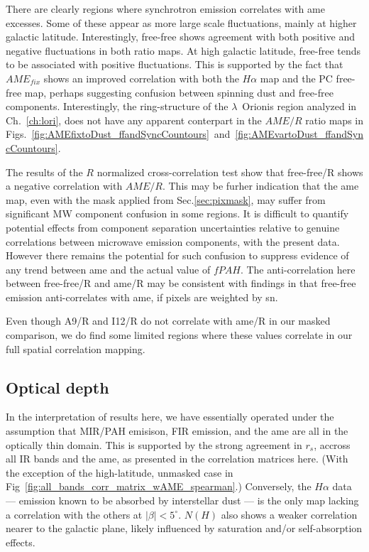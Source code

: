              There are clearly regions where synchrotron emission correlates with \acrshort{ame} excesses. Some of these appear as more large scale fluctuations, mainly at higher galactic latitude. Interestingly, free-free shows agreement with both positive and negative fluctuations in both ratio maps. At high galactic latitude, free-free tends to be associated with positive fluctuations. This is supported by the fact that $AME_{fix}$ shows an improved correlation with both the $H\alpha{}$ map and the PC free-free map, perhaps suggesting confusion between spinning dust and free-free components. Interestingly, the ring-structure of the $\lambda$~Orionis region analyzed in Ch.~\ref{ch:lori}, does not have any apparent conterpart in the $AME/R$ ratio maps in Figs.~\ref{fig:AMEfixtoDust_ffandSyncCountours}~and~\ref{fig:AMEvartoDust_ffandSyncCountours}.

             The results of the $R$ normalized cross-correlation test show that free-free/R shows a negative correlation with $AME/R$. This may be furher indication that the \acrshort{ame} map, even with the mask applied from Sec.\ref{sec:pixmask}, may suffer from significant MW component confusion in some regions. It is difficult to quantify potential effects from component separation uncertainties relative to genuine correlations between microwave emission components, with the present data. However there remains the potential for such confusion to suppress evidence of any trend between \acrshort{ame} and the actual value of $fPAH$. The anti-correlation here between free-free/R and \acrshort{ame}/R may be consistent with findings in \cite{vonHausegger15} that free-free emission anti-correlates with \acrshort{ame}, if pixels are weighted by \acrshort{sn}.

             Even though A9/R and I12/R do not correlate with \acrshort{ame}/R in our masked comparison, we do find some limited regions where these values correlate in our full spatial correlation mapping.

            \subsection{Optical depth}
              In the interpretation of results here, we have essentially operated under the assumption that MIR/PAH emisison, FIR emission, and the \acrshort{ame} are all in the optically thin domain. This is supported by the strong agreement in $r_{s}$, accross all IR bands and the \acrshort{ame}, as presented in the correlation matrices here. (With the exception of the high-latitude, unmasked case in Fig~\ref{fig:all_bands_corr_matrix_wAME_spearman}.) Conversely, the $H{\alpha}$ data --- emission known to be absorbed by interstellar dust --- is the only map lacking a correlation with the others at $|\beta{}|<5^{\circ}$. $N(H)$ also shows a weaker correlation nearer to the galactic plane, likely influenced by saturation and/or self-absorption effects.

